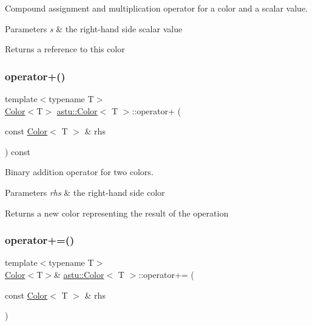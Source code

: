 Compound assignment and multiplication operator for a color and a scalar value.


\begin{DoxyParams}{Parameters}
{\em s} & the right-\/hand side scalar value \\
\hline
\end{DoxyParams}
\begin{DoxyReturn}{Returns}
a reference to this color 
\end{DoxyReturn}
\mbox{\label{classastu_1_1Color_a7f1c0093d51c4036f7ab5755d571d6e7}} 
\subsubsection{\texorpdfstring{operator+()}{operator+()}}
{\footnotesize\ttfamily template$<$typename T$>$ \\
\hyperlink{classastu_1_1Color}{Color}$<$T$>$ \hyperlink{classastu_1_1Color}{astu\+::\+Color}$<$ T $>$\+::operator+ (\begin{DoxyParamCaption}\item[{const \hyperlink{classastu_1_1Color}{Color}$<$ T $>$ \&}]{rhs }\end{DoxyParamCaption}) const\hspace{0.3cm}{\ttfamily [inline]}}

Binary addition operator for two colors.


\begin{DoxyParams}{Parameters}
{\em rhs} & the right-\/hand side color \\
\hline
\end{DoxyParams}
\begin{DoxyReturn}{Returns}
a new color representing the result of the operation 
\end{DoxyReturn}
\mbox{\label{classastu_1_1Color_ab4cafbc5cbd4aa28a8feb428107d3985}} 
\subsubsection{\texorpdfstring{operator+=()}{operator+=()}}
{\footnotesize\ttfamily template$<$typename T$>$ \\
\hyperlink{classastu_1_1Color}{Color}$<$T$>$\& \hyperlink{classastu_1_1Color}{astu\+::\+Color}$<$ T $>$\+::operator+= (\begin{DoxyParamCaption}\item[{const \hyperlink{classastu_1_1Color}{Color}$<$ T $>$ \&}]{rhs }\end{DoxyParamCaption})\hspace{0.3cm}{\ttfamily [inline]}}

